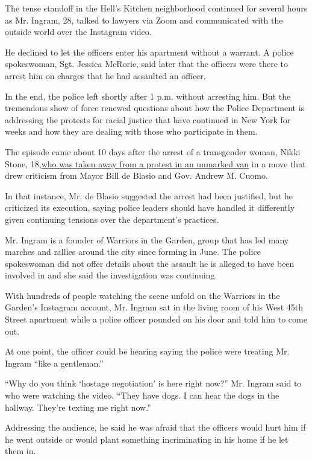 The tense standoff in the Hell's Kitchen neighborhood continued for
several hours as Mr. Ingram, 28, talked to lawyers via Zoom and
communicated with the outside world over the Instagram video.

He declined to let the officers enter his apartment without a warrant. A
police spokeswoman, Sgt. Jessica McRorie, said later that the officers
were there to arrest him on charges that he had assaulted an officer.

In the end, the police left shortly after 1 p.m. without arresting him.
But the tremendous show of force renewed questions about how the Police
Department is addressing the protests for racial justice that have
continued in New York for weeks and how they are dealing with those who
participate in them.

The episode came about 10 days after the arrest of a transgender woman,
Nikki Stone,
18,\href{https://www.nytimes3xbfgragh.onion/2020/07/28/nyregion/nypd-protester-van.html}{who
was taken away from a protest in an unmarked van} in a move that drew
criticism from Mayor Bill de Blasio and Gov. Andrew M. Cuomo.

In that instance, Mr. de Blasio suggested the arrest had been justified,
but he criticized its execution, saying police leaders should have
handled it differently given continuing tensions over the department's
practices.

Mr. Ingram is a founder of Warriors in the Garden, group that has led
many marches and rallies around the city since forming in June. The
police spokeswoman did not offer details about the assault he is alleged
to have been involved in and she said the investigation was continuing.

With hundreds of people watching the scene unfold on the Warriors in the
Garden's Instagram account, Mr. Ingram sat in the living room of his
West 45th Street apartment while a police officer pounded on his door
and told him to come out.

At one point, the officer could be hearing saying the police were
treating Mr. Ingram ``like a gentleman.''

``Why do you think `hostage negotiation' is here right now?'' Mr. Ingram
said to who were watching the video. ``They have dogs. I can hear the
dogs in the hallway. They're texting me right now.''

Addressing the audience, he said he was afraid that the officers would
hurt him if he went outside or would plant something incriminating in
his home if he let them in.


